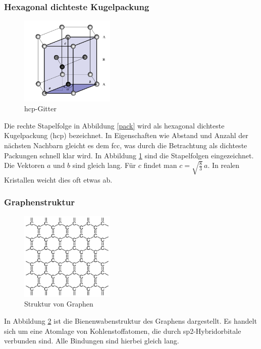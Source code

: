         \subsubsection{Hexagonal dichteste Kugelpackung}

\begin{figure}
    \centering
    \includegraphics[width=0.4\textwidth]{Abb/hcp.png}
    \caption{hcp-Gitter}
    \label{hcp}
\end{figure}
Die rechte Stapelfolge in Abbildung \ref{pack} wird als hexagonal dichteste
Kugelpackung (hcp) bezeichnet. In Eigenschaften wie Abstand und Anzahl der nächsten
Nachbarn gleicht es dem fcc, was durch die Betrachtung als dichteste Packungen 
schnell klar wird. In Abbildung \ref{hcp} sind die Stapelfolgen eingezeichnet.
Die Vektoren $a$ und $b$ sind gleich lang. Für $c$ findet man $c = \sqrt{ 
\frac{8}{3}} \, a$. In realen Kristallen weicht dies oft etwas ab.

        \subsubsection{Graphenstruktur}

\begin{figure}
    \centering
    \includegraphics[width=0.4\textwidth]{Abb/graphenstruktur.pdf}
    \caption{Struktur von Graphen}
    \label{graphenstruktur}
\end{figure}
In Abbildung \ref{graphenstruktur} ist die Bienenwabenstruktur des Graphens 
dargestellt. Es handelt sich um eine Atomlage von Kohlenstoffatomen, die durch
sp2-Hybridorbitale verbunden sind. Alle Bindungen sind hierbei gleich lang.

